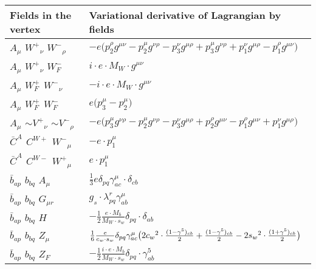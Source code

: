 \begin{center}
\begin{tabular}{|l|l|} \hline
Fields in the vertex & Variational derivative of Lagrangian by fields \\ \hline
${A}_{\mu }$ \phantom{-} $W^+{}_{\nu }$ \phantom{-} $W^-{}_{\rho }$ \phantom{-}  &
	$- e\big(p_2^\rho g^{\mu \nu} -p_2^\mu g^{\nu \rho} -p_3^\nu g^{\mu \rho} +p_3^\mu g^{\nu \rho} +p_1^\nu g^{\mu \rho} -p_1^\rho g^{\mu \nu} \big)$\\[2mm]
${A}_{\mu }$ \phantom{-} $W^+{}_{\nu }$ \phantom{-} $W^-_F{}_{}$ \phantom{-}  &
	$ i \cdot e \cdot M_W\cdot g^{\mu \nu} $\\[2mm]
${A}_{\mu }$ \phantom{-} $W^+_F{}_{}$ \phantom{-} $W^-{}_{\nu }$ \phantom{-}  &
	$- i \cdot e \cdot M_W\cdot g^{\mu \nu} $\\[2mm]
${A}_{\mu }$ \phantom{-} $W^+_F{}_{}$ \phantom{-} $W^-_F{}_{}$ \phantom{-}  &
	$ e\big(p_3^\mu -p_2^\mu \big)$\\[2mm]
${A}_{\mu }$ \phantom{-} $\sim V^+{}_{\nu }$ \phantom{-} $\sim V^-{}_{\rho }$ \phantom{-}  &
	$- e\big(p_3^\mu g^{\nu \rho} -p_2^\mu g^{\nu \rho} -p_3^\nu g^{\mu \rho} +p_2^\rho g^{\mu \nu} -p_1^\rho g^{\mu \nu} +p_1^\nu g^{\mu \rho} \big)$\\[2mm]
$\bar{C}^A{}_{}$ \phantom{-} $C^{W+}{}_{}$ \phantom{-} $W^-{}_{\mu }$ \phantom{-}  &
	$- e\cdot p_1^\mu $\\[2mm]
$\bar{C}^A{}_{}$ \phantom{-} $C^{W-}{}_{}$ \phantom{-} $W^+{}_{\mu }$ \phantom{-}  &
	$ e\cdot p_1^\mu $\\[2mm]
$\bar{b}{}_{a p }$ \phantom{-} $b{}_{b q }$ \phantom{-} ${A}_{\mu }$ \phantom{-}  &
	$\frac{1}{3} e\delta_{p q} \gamma_{a c}^\mu \cdot \delta_{c b} $\\[2mm]
$\bar{b}{}_{a p }$ \phantom{-} $b{}_{b q }$ \phantom{-} ${G}_{\mu r }$ \phantom{-}  &
	$ g_s\cdot \lambda_{p q}^r \gamma_{a b}^\mu $\\[2mm]
$\bar{b}{}_{a p }$ \phantom{-} $b{}_{b q }$ \phantom{-} ${H}_{}$ \phantom{-}  &
	$-\frac{1}{2}\frac{ e \cdot M_b}{ M_W \cdot s_w}\delta_{p q} \cdot \delta_{a b} $\\[2mm]
$\bar{b}{}_{a p }$ \phantom{-} $b{}_{b q }$ \phantom{-} ${Z}_{\mu }$ \phantom{-}  &
	$\frac{1}{6}\frac{ e}{ c_w \cdot s_w}\delta_{p q} \gamma_{a c}^\mu \big(2 c_w{}^2 \cdot {(1-\gamma^5)_{c b}\over 2} +{(1-\gamma^5)_{c b}\over 2} -2 s_w{}^2 \cdot {(1+\gamma^5)_{c b}\over 2} \big)$\\[2mm]
$\bar{b}{}_{a p }$ \phantom{-} $b{}_{b q }$ \phantom{-} $Z_F{}_{}$ \phantom{-}  &
	$-\frac{1}{2}\frac{ i \cdot e \cdot M_b}{ M_W \cdot s_w}\delta_{p q} \cdot \gamma_{a b}^5 $\\[2mm]

\end{tabular}
\end{center}
